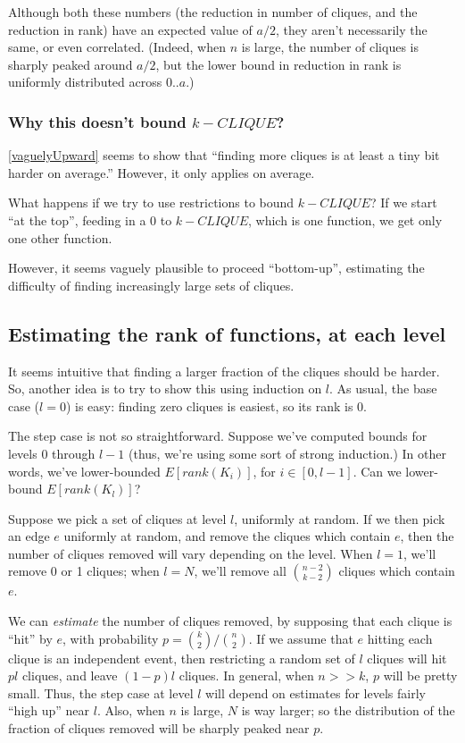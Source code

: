 \documentclass[12pt]{article}
\theoremstyle{definition}
\begin{document}
Although both these numbers (the reduction in number of cliques, and
the reduction in rank) have an expected value of $a/2$,
they aren't necessarily the same, or even correlated.
(Indeed, when $n$ is large, the number of cliques is sharply peaked around $a/2$,
but the lower bound in reduction in rank is uniformly distributed across $0..a$.)

\subsubsection{Why this doesn't bound $k-CLIQUE$?}

\ref{vaguelyUpward} seems to show that ``finding more cliques is
at least a tiny bit harder on average.'' However, it only applies
on average.

What happens if we try to use restrictions to bound $k-CLIQUE$?
If we start ``at the top'',
feeding in a 0 to $k-CLIQUE$, which is one function,
we get only one other function.

However, it seems vaguely plausible to proceed ``bottom-up'',
estimating the difficulty of finding increasingly large
sets of cliques.

\subsection{Estimating the rank of functions, at each level}

It seems intuitive that finding a larger fraction of the cliques
should be harder.
So, another idea is to try to show this using induction on $l$.
As usual, the base case ($l=0$) is easy: finding zero cliques is easiest,
so its rank is 0.

The step case is not so straightforward. Suppose we've computed bounds for
levels 0 through $l-1$ (thus, we're using some sort of strong induction.)
In other words, we've lower-bounded $E[rank(K_i)]$, for $i \in [0,l-1]$.
Can we lower-bound $E[rank(K_l)]$?

Suppose we pick a set of cliques at level $l$, uniformly at random.
If we then pick an edge $e$ uniformly at random, and remove the cliques
which contain $e$, then the number of cliques removed will vary
depending on the level. When $l=1$, we'll remove 0 or 1 cliques; when $l=N$,
we'll remove all ${n-2 \choose k-2}$ cliques which contain $e$.

We can {\em estimate} the number of cliques removed, by supposing that each
clique is ``hit'' by $e$, with probability $p = {k \choose 2} / {n \choose 2}$.
If we assume that $e$ hitting each clique is an independent event, then
restricting a random set of $l$ cliques will hit $pl$ cliques, and
leave $(1-p)l$ cliques.
In general, when $n>>k$, $p$ will be pretty small. Thus, the step case at
level $l$ will depend on estimates for levels fairly ``high up'' near $l$.
Also, when $n$ is large, $N$ is way larger; so the distribution of
the fraction of cliques removed will be sharply peaked near $p$.
\end{document}
